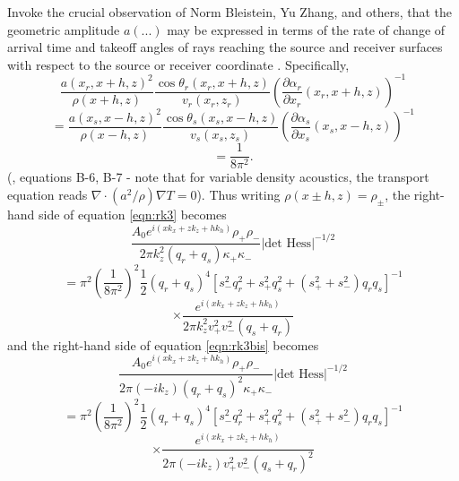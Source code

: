 Invoke the crucial observation of Norm Bleistein, Yu
Zhang, and others, that the geometric amplitude $a(...)$ may be
expressed in terms of the rate of change of arrival time and takeoff
angles of rays reaching the source and receiver surfaces with respect
to the source or receiver coordinate
\cite[]{ZhangBleistein:03,ZhangBleistein:05,ZhangSunGray:07,ZhangYuSun:08}.
Specifically,
\[
\frac{a(x_r,x+h,z)^2}{\rho(x+h,z)}\frac{\cos
  \theta_r(x_r,x+h,z)}{v_r(x_r,z_r)}\left(\frac{\partial
    \alpha_r}{\partial x_r}(x_r,x+h,z)\right)^{-1} 
\]
\[
 = \frac{a(x_s,x-h,z)^2}{\rho(x-h,z)}\frac{\cos
   \theta_s(x_s,x-h,z)}{v_s(x_s,z_s)}\left(\frac{\partial
     \alpha_s}{\partial x_s}(x_s,x-h,z)\right)^{-1}
\]
\begin{equation}
\label{eqn:raytube}
= \frac{1}{8\pi^2}. 
\end{equation}
(\cite[]{HouSymes:15}, equations B-6, B-7 - note that for variable
density acoustics, the transport equation reads $\nabla \cdot
(a^2/\rho) \nabla T=0$). Thus writing $\rho(x\pm h,z)=\rho_{\pm}$, the
right-hand side of equation \ref{eqn:rk3} becomes
\[
\frac{A_0 e^{i(xk_{x}+zk_{z}+hk_{h})}\rho_+\rho_-}{2\pi 
  k^2_z(q_r + q_s)\kappa_+\kappa_-} |\mbox{det Hess}|^{-1/2} 
\]
\[
=\pi^2 \left(\frac{1}{8\pi^2}\right)^2 
 \frac{1}{2} (q_r+q_s)^4[s_-^2q_r^2 + s_+^2q_s^2 +
(s_+^2+s_-^2)q_rq_s]^{-1}
\]
\begin{equation}
\label{eqn:rk4}
\times \frac{e^{i(xk_{x}+zk_{z}+hk_{h})}}{2\pi 
  k^2_zv_+^2v_-^2(q_s+q_r)} 
\end{equation}
and the right-hand side of equation \ref{eqn:rk3bis} becomes
\[
\frac{A_0 e^{i(xk_{x}+zk_{z}+hk_{h})}\rho_+\rho_-}{2\pi 
  (-ik_z)(q_r + q_s)^2\kappa_+\kappa_-} |\mbox{det Hess}|^{-1/2} 
\]
\[
=\pi^2 \left(\frac{1}{8\pi^2}\right)^2 
 \frac{1}{2} (q_r+q_s)^4[s_-^2q_r^2 + s_+^2q_s^2 +
(s_+^2+s_-^2)q_rq_s]^{-1}
\]
\begin{equation}
\label{eqn:rk4bis}
\times \frac{e^{i(xk_{x}+zk_{z}+hk_{h})}}{2\pi 
  (-ik_z)v_+^2v_-^2(q_s+q_r)^2} 
\end{equation}

